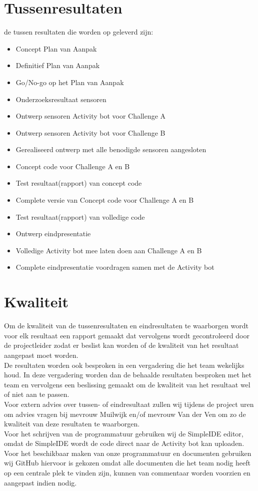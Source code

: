 \documentclass[oneside]{book}
\begin{document}
\chapter{Tussenresultaten}
	de tussen resultaten die worden op geleverd zijn:
\begin{itemize}
	\item Concept Plan van Aanpak
	\item Definitief Plan van Aanpak
	\item Go/No-go op het Plan van Aanpak
	\item Onderzoeksresultaat sensoren
	\item Ontwerp sensoren Activity bot voor Challenge A
	\item Ontwerp sensoren Activity bot voor Challenge B
	\item Gerealiseerd ontwerp met alle benodigde sensoren aangesloten
	\item Concept code voor Challenge A en B
	\item Test resultaat(rapport) van concept code
	\item Complete versie van Concept code voor Challenge A en B
	\item Test resultaat(rapport) van volledige code
	\item Ontwerp eindpresentatie
	\item Volledige Activity bot mee laten doen aan Challenge A en B
	\item Complete eindpresentatie voordragen samen met de Activity bot
\end{itemize}
\clearpage
\chapter{Kwaliteit}
{\color{red}Om de kwaliteit van de tussenresultaten en eindresultaten te waarborgen wordt voor elk resultaat een rapport gemaakt dat vervolgens wordt gecontroleerd door de projectleider zodat er beslist kan worden of de kwaliteit van het resultaat aangepast moet worden.\\  

De resultaten worden ook besproken in een vergadering die het team wekelijks houd. In deze vergadering worden dan de behaalde resultaten besproken met het team en vervolgens een beslissing gemaakt om de kwaliteit van het resultaat wel of niet aan te passen.\\ 

Voor extern advies over tussen-  of eindresultaat zullen wij tijdens de project uren om advies vragen bij mevrouw Muilwijk en/of mevrouw Van der Ven om zo de kwaliteit van deze resultaten te waarborgen. \\

Voor het schrijven van de programmatuur gebruiken wij de SimpleIDE editor, omdat de SimpleIDE wordt de code direct naar de Activity bot kan uploaden.\\

Voor het beschikbaar maken van onze programmatuur en documenten gebruiken wij GitHub hiervoor is gekozen omdat alle documenten die het team nodig heeft op een centrale plek te vinden zijn, kunnen van commentaar worden voorzien en aangepast indien nodig.\\
}
\clearpage
\end{document}
